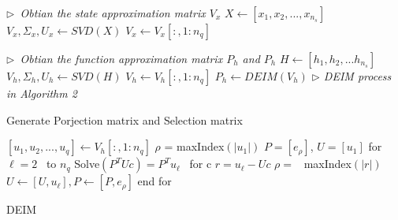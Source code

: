 \begin{algorithm}
\emph{$\triangleright$\ Obtian the state approximation matrix \(V_x\)}\;
$ X \leftarrow [x_1,x_2,...,x_{n_s}]$	\;
$ V_x,\Sigma_x,U_x \leftarrow SVD(X)$	\;
$ V_x \leftarrow V_x[:,1:n_q]$	\;

\emph{$\triangleright$\ Obtian the function approximation matrix \(P_h\) and \(P_h\)}\;
$ H \leftarrow [h_1,h_2,...h_{n_s}] $	\;
$ V_h,\Sigma_h,U_h \leftarrow SVD(H)$	\;
$ V_h \leftarrow V_h[:,1:n_q]$	\;
$ P_h  \leftarrow DEIM(V_h)$	\qquad \emph{$\triangleright$ DEIM process in Algorithm 2}\;

 \caption{Generate Porjection matrix and Selection matrix}
 \label{alg:Gen_PUV}
\end{algorithm}
\begin{algorithm}
$[u_1,u_2,...,u_q] \leftarrow V_h[:,1:n_q]$	\;
$\rho$ = maxIndex$(|u_1|)$							\;
$P = [e_{\rho}]$, \quad $U = [u_1]$			\;
for $\ell = 2$ \ to \(n_q\) 							\;
\qquad	Solve$(P^T U c) = P^T u_{\ell}$ \ for c	\;
\qquad	$r = u_{\ell} -Uc$						\;
\qquad	$\rho =$ \ maxIndex$(|r|)$						\;
\qquad	$U \leftarrow [U,u_{\ell}], P \leftarrow [P,e_{\rho}]$		\;
end for	
 \caption{DEIM}
 \label{alg:deim}
\end{algorithm}


